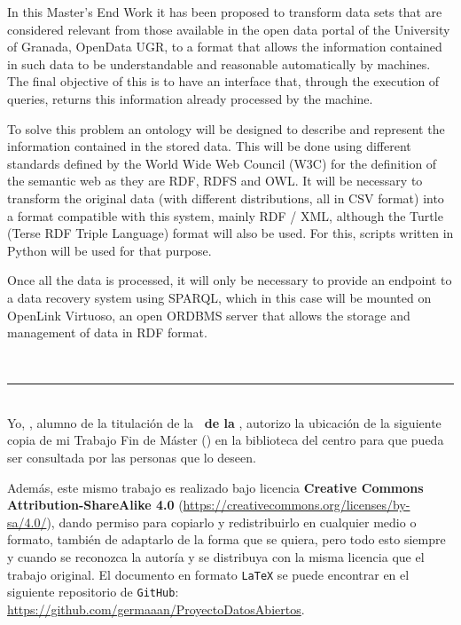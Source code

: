 In this Master's End Work it has been proposed to transform data sets that are considered relevant from those available in the open data portal of the University of Granada, OpenData UGR, to a format that allows the information contained in such data to be understandable and reasonable automatically by machines. The final objective of this is to have an interface that, through the execution of queries, returns this information already processed by the machine.
\bigskip

To solve this problem an ontology will be designed to describe and represent the information contained in the stored data. This will be done using different standards defined by the World Wide Web Council (W3C) for the definition of the semantic web as they are RDF, RDFS and OWL. It will be necessary to transform the original data (with different distributions, all in CSV format) into a format compatible with this system, mainly RDF / XML, although the Turtle (Terse RDF Triple Language) format will also be used. For this, scripts written in Python will be used for that purpose.

\bigskip
Once all the data is processed, it will only be necessary to provide an endpoint to a data recovery system using SPARQL, which in this case will be mounted on OpenLink Virtuoso, an open ORDBMS server that allows the storage and management of data in RDF format.

\newpage
\thispagestyle{empty}
\
\vspace{3cm}

\noindent\rule[-1ex]{\textwidth}{2pt}\\[4.5ex]

Yo, \textbf{\autor}, alumno de la titulación \textbf{\master} de la \textbf{\escuela\ de la \universidad}, autorizo la ubicación de la siguiente copia de mi Trabajo Fin de Máster (\textit{\titulo}) en la biblioteca del centro para que pueda ser consultada por las personas que lo deseen.

\bigskip
Además, este mismo trabajo es realizado bajo licencia \textbf{Creative Commons Attribution-ShareAlike 4.0} (\url{https://creativecommons.org/licenses/by-sa/4.0/}), dando permiso para copiarlo y redistribuirlo en cualquier medio o formato, también de adaptarlo de la forma que se quiera, pero todo esto siempre y cuando se reconozca la autoría y se distribuya con la misma licencia que el trabajo original. El documento en formato {\tt LaTeX} se puede encontrar en el siguiente repositorio de {\tt GitHub}: \url{https://github.com/germaaan/ProyectoDatosAbiertos}.

